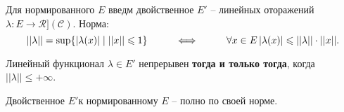 
\begin{to_def}
	Для нормированного $E$ введм двойственное $E'$ -- линейных оторажений $\lambda \colon E \to \mathcal{R]}(\mathcal{C})$. Норма:
	\begin{equation*}
		||\lambda|| = \sup \{ |\lambda(x)| \mid ||x|| \leq 1\}
		\hspace{1 cm}
		\Longleftrightarrow
		\hspace{1 cm}
		\forall x \in E \, |\lambda(x)| \leq ||\lambda|| \cdot ||x||.
	\end{equation*}
\end{to_def}

\begin{to_lem}
	Линейный функционал $\lambda \in E'$ непрерывен \textbf{тогда и только тогда}, когда $||\lambda|| \leq +\infty$. 
\end{to_lem}

\begin{to_thr}
	Двойственное $E'$к нормированному $E$ -- полно по своей норме.
\end{to_thr}